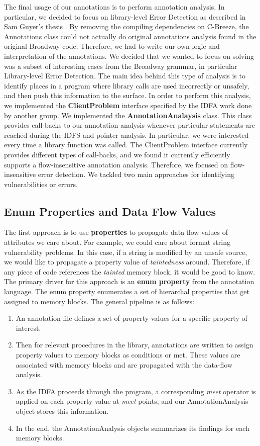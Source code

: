The final usage of our annotations is to perform annotation analysis. In particular, we decided to focus on library-level Error Detection as described in Sam Guyer's thesis \citep{bdwythesis}. By removing the compiling dependencies on C-Breeze, the Annotations class could not actually do original annotations analysis found in the original Broadway code. Therefore, we had to write our own logic and interpretation of the annotations.  We decided that we wanted to focus on solving was a subset of interesting cases from the Broadway grammar, in particular Library-level Error Detection. The main idea behind this  type of analysis is to identify places in a program where library calls are used incorrectly or unsafely, and then push this information to the surface. In order to perform this analysis, we implemented the {\bf ClientProblem} interface specified by the IDFA work done by another group. We implemented the {\bf AnnotationAnalaysis} class. This class provides call-backs to our annotation analysis whenever particular statements are reached during the IDFS and pointer analysis. In particular, we were interested every time a library function was called. The ClientProblem interface currently provides different types of call-backs, and we found it currently efficiently supports a flow-insensitive annotation analysis. Therefore, we focused on flow-insensitive error detection. We tackled two main approaches for identifying vulnerabilities or errors.

\subsection{Enum Properties and Data Flow Values}\label{sec:enumprops}
The first approach is to use {\bf properties} to propagate data flow values of attributes we care about. For example, we could care about format string vulnerability problems. In this case, if a string is modified by an unsafe source, we would like to propagate a property value of \textit{taintedness} around. Therefore, if any piece of code references the \textit{tainted} memory block, it would be good to know. The primary driver for this approach is an {\bf enum property} from the annotation language. The enum property  enumerates a set of hierarchal properties that get assigned to memory blocks. The general pipeline is as follows:

\begin{enumerate}
\item An annotation file defines a set of property values for a specific property of interest. \item Then for relevant procedures in the library, annotations are written to assign property values to memory blocks as conditions or met. These values are associated with memory blocks and are propagated with the data-flow analysis. 
\item As the IDFA proceeds through the program, a corresponding \textit{meet} operator is applied on each property value at \textit{meet} points, and our AnnotationAnalysis object stores this information. 
\item In the end, the AnnotationAnalysis objects summarizes its findings for each memory blocks.
\end{enumerate}

